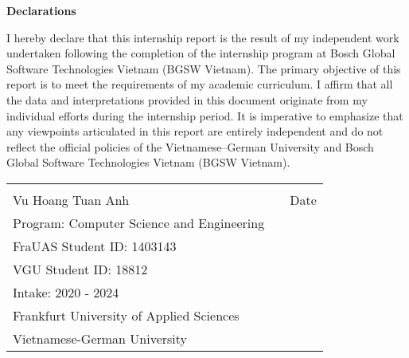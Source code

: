 \centerline{\LARGE \textbf{Declarations}}

\vspace{10mm}

I hereby declare that this internship report is the result of my independent work undertaken following the completion of the internship program at Bosch Global Software Technologies Vietnam (BGSW Vietnam). The primary objective of this report is to meet the requirements of my academic curriculum. I affirm that all the data and interpretations provided in this document originate from my individual efforts during the internship period. It is imperative to emphasize that any viewpoints articulated in this report are entirely independent and do not reflect the official policies of the Vietnamese–German University and Bosch Global Software Technologies Vietnam (BGSW Vietnam).

\vfill

\begin{tabular}{@{}p{3.5in}p{0.1in}p{1.5in}@{}}
  \hrulefill & & \hrulefill \\
  Vu Hoang Tuan Anh & & Date \\
  Program: Computer Science and Engineering & & \\ 
  FraUAS Student ID: 1403143 & & \\
  VGU Student ID: 18812 & & \\
  Intake: 2020 - 2024 & & \\
  Frankfurt University of Applied Sciences & & \\
  Vietnamese-German University & & \\
\end{tabular}